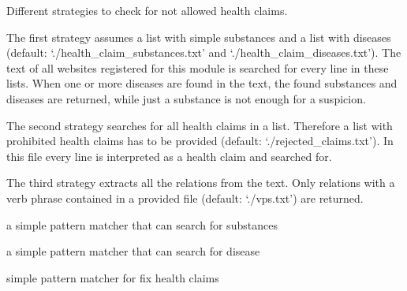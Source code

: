 \documentclass[letterpaper,10pt,english]{sphinxmanual}
\begin{document}
\begin{fulllineitems}
\label{\detokenize{api:health_claims.HealthClaims}}
Different strategies to check for not allowed health claims.

The first strategy assumes a list with simple substances and a
list with diseases (default: ‘./health\_claim\_substances.txt’
and ‘./health\_claim\_diseases.txt’). The text of all websites
registered for this module is searched for every line in these
lists. When one or more diseases are found in the text, the found
substances and diseases are returned, while just a substance is
not enough for a suspicion.

The second strategy searches for all health claims in a
list. Therefore a list with prohibited health claims has to be
provided (default: ‘./rejected\_claims.txt’). In this file every
line is interpreted as a health claim and searched for.

The third strategy extracts all the relations from the text. Only
relations with a verb phrase contained in a provided file
(default: ‘./vps.txt’) are returned.

\begin{fulllineitems}
\label{\detokenize{api:health_claims.HealthClaims.pattern_matcher_sub}}
a simple pattern matcher that can search
for substances

\end{fulllineitems}


\begin{fulllineitems}
\label{\detokenize{api:health_claims.HealthClaims.pattern_matcher_dis}}
a simple pattern matcher that can search
for disease

\end{fulllineitems}


\begin{fulllineitems}
\label{\detokenize{api:health_claims.HealthClaims.pattern_matcher_fix}}
simple pattern matcher for fix health
claims


\end{fulllineitems}
\end{fulllineitems}
\end{document}
